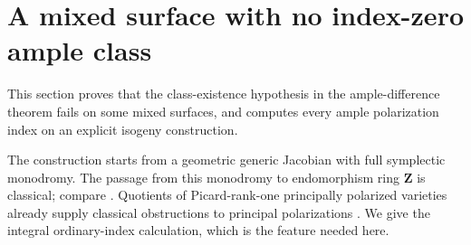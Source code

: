\section{A mixed surface with no index-zero ample class}
\label{sec:no-zero-class}

This section proves that the class-existence hypothesis in the ample-difference theorem fails on some mixed surfaces, and computes every ample polarization index on an explicit isogeny construction.

The construction starts from a geometric generic Jacobian with full symplectic monodromy. The passage from this monodromy to endomorphism ring $\mathbf Z$ is classical; compare \citet[Corollary~4.2, p.~297]{Chai}. Quotients of Picard-rank-one principally polarized varieties already supply classical obstructions to principal polarizations \citep[\S11.24, p.~169]{EGM}. We give the integral ordinary-index calculation, which is the feature needed here.

